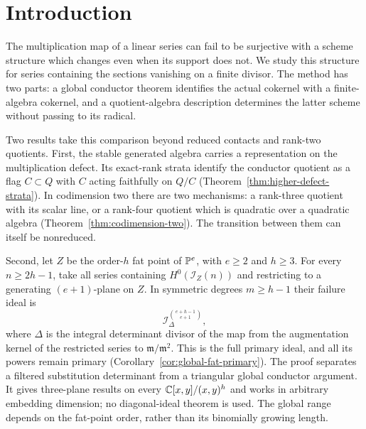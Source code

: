 \section{Introduction}
\label{sec:conductor-introduction}
The multiplication map of a linear series can fail to be surjective
with a scheme structure which changes even when its support does
not. We study this structure for series containing the sections
vanishing on a finite divisor. The method has two parts: a global
conductor theorem identifies the actual cokernel with a finite-algebra
cokernel, and a quotient-algebra description determines the latter
scheme without passing to its radical.

Two results take this comparison beyond reduced contacts and rank-two
quotients. First, the stable generated algebra carries a representation
on the multiplication defect. Its exact-rank strata identify the
conductor quotient as a flag $C\subset Q$ with $C$ acting faithfully
on $Q/C$ (Theorem~\ref{thm:higher-defect-strata}). In codimension two
there are two mechanisms: a rank-three quotient with its scalar line,
or a rank-four quotient which is quadratic over a quadratic algebra
(Theorem~\ref{thm:codimension-two}). The transition between them can
itself be nonreduced.

Second, let $Z$ be the order-$h$ fat point of $\mathbb P^e$, with $e\ge2$
and $h\ge3$. For every $n\ge2h-1$, take all series containing
$H^0(\mathcal I_Z(n))$ and restricting to a generating $(e+1)$-plane
on $Z$. In symmetric degrees $m\ge h-1$ their failure ideal is
\begin{equation}\label{eq:intro-fat-main}
 \mathcal I_\Delta^{\binom{e+h-1}{e+1}},
\end{equation}
where $\Delta$ is the integral determinant divisor of the map from
the augmentation kernel of the restricted series to
$\mathfrak m/\mathfrak m^2$. This is the full primary ideal, and
all its powers remain primary (Corollary~\ref{cor:global-fat-primary}).
The proof separates a filtered substitution determinant from a
triangular global conductor argument. It gives three-plane results
on every $\mathbb C[x,y]/(x,y)^h$ and works in arbitrary embedding dimension;
no diagonal-ideal theorem is used. The global range depends on the
fat-point order, rather than its binomially growing length.


